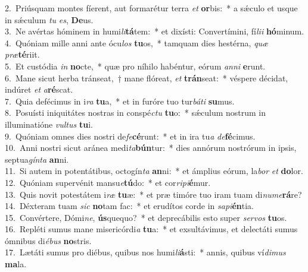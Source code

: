 {2.~}Priúsquam montes fíerent, aut formarétur terra \textit{et} \textbf{or}bis:~* a sǽculo et usque in sǽculum \textit{tu} \textit{es}, \textbf{De}us.\\
{3.~}Ne avértas hóminem in humi\textit{li}\textbf{tá}tem:~* et dixísti: Convertímini, fí\textit{li}\textit{i} \textbf{hó}minum.\\
{4.~}Quóniam mille anni ante ócu\textit{los} \textbf{tu}os,~* tamquam dies hestérna, \textit{quæ} \textit{præ}\textbf{té}riit.\\
{5.~}Et custódia \textit{in} \textbf{no}cte,~* quæ pro níhilo habéntur, eórum \textit{an}\textit{ni} \textbf{e}runt.\\
{6.~}Mane sicut herba tránseat,~† mane flóreat, \textit{et} \textbf{trán}seat:~* véspere décidat, indúret \textit{et} \textit{a}\textbf{ré}scat.\\
{7.~}Quia defécimus in i\textit{ra} \textbf{tu}a,~* et in furóre tuo tur\textit{bá}\textit{ti} \textbf{su}mus.\\
{8.~}Posuísti iniquitátes nostras in conspé\textit{ctu} \textbf{tu}o:~* sǽculum nostrum in illuminatióne \textit{vul}\textit{tus} \textbf{tu}i.\\
{9.~}Quóniam omnes dies nostri de\textit{fe}\textbf{cé}runt:~* et in ira tu\textit{a} \textit{de}\textbf{fé}cimus.\\
{10.~}Anni nostri sicut aránea medi\textit{ta}\textbf{bún}tur:~* dies annórum nostrórum in ipsis, septua\textit{gín}\textit{ta} \textbf{an}ni.\\
{11.~}Si autem in potentátibus, octogín\textit{ta} \textbf{an}ni:~* et ámplius eórum, la\textit{bor} \textit{et} \textbf{do}lor.\\
{12.~}Quóniam supervénit mansu\textit{e}\textbf{tú}do:~* et cor\textit{ri}\textit{pi}\textbf{é}mur.\\
{13.~}Quis novit potestátem i\textit{ræ} \textbf{tu}æ:~* et præ timóre tuo iram tuam di\textit{nu}\textit{me}\textbf{rá}re?\\
{14.~}Déxteram tuam \textit{sic} \textbf{no}tam fac:~* et erudítos corde in \textit{sa}\textit{pi}\textbf{én}tia.\\
{15.~}Convértere, Dómi\textit{ne}, \textbf{ús}quequo?~* et deprecábilis esto super \textit{ser}\textit{vos} \textbf{tu}os.\\
{16.~}Repléti sumus mane misericórdi\textit{a} \textbf{tu}a:~* et exsultávimus, et delectáti sumus ómnibus di\textit{é}\textit{bus} \textbf{no}stris.\\
{17.~}Lætáti sumus pro diébus, quibus nos humi\textit{li}\textbf{á}sti:~* annis, quibus ví\textit{di}\textit{mus} \textbf{ma}la.\\
